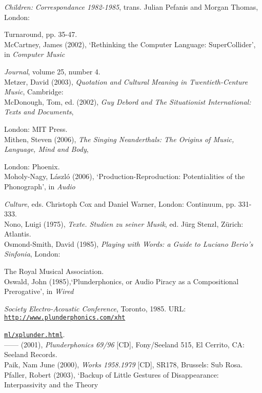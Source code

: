 \emph{Children:} \emph{Correspondance 1982-1985}, trans. Julian Pefanis and Morgan Thomas, London: 

Turnaround, pp. 35-47. 
\hypertarget{mccartney}{}\\
McCartney, James (2002), `Rethinking the Computer Language: SuperCollider', in \emph{Computer Music} 

\emph{Journal}, volume 25, number 4.
\hypertarget{metzer}{}\\
Metzer, David (2003), \emph{Quotation and Cultural Meaning in Twentieth-Centure Music}, Cambridge: 
\hypertarget{mcdonough}{}\\
McDonough, Tom, ed. (2002), \emph{Guy Debord and The Situationist International: Texts and Documents}, 

London: MIT Press. 
\hypertarget{mithen}{}\\
Mithen, Steven (2006), \emph{The Singing Neanderthals: The Origins of Music, Language, Mind and Body}, 

London: Phoenix. 
\hypertarget{moholy}{}\\
Moholy-Nagy, L\'{a}szl\'{o} (2006),  `Production-Reproduction: Potentialities of the Phonograph', in \emph{Audio} 

\emph{Culture}, eds. Christoph Cox and Daniel Warner, London: Continuum, pp. 331-333.
\hypertarget{nono}{}\\
Nono, Luigi (1975), \emph{Texte. Studien zu seiner Musik}, ed. J\"{u}rg Stenzl, Z\"{u}rich: Atlantis. 
\hypertarget{ossmith}{}\\
Osmond-Smith, David (1985), \emph{Playing with Words: a Guide to Luciano Berio's Sinfonia},  London: 

The Royal Musical Association. 
\hypertarget{oswald}{}\\
Oswald, John (1985),`Plunderphonics, or Audio Piracy as a Compositional Prerogative', in \emph{Wired}

\emph{Society Electro-Acoustic Conference}, Toronto, 1985. URL: \href{http://www.plunderphonics.com/xhtml/xplunder.html}{\texttt{http://www.plunderphonics.com/xht}}

\href{http://www.plunderphonics.com/xhtml/xplunder.html}{\texttt{ml/xplunder.html}}.
\hypertarget{oswaldcd}{}\\
------ (2001), \emph{Plunderphonics 69/96} [CD], Fony/Seeland 515, El Cerrito, CA: Seeland Records.  
\hypertarget{paik}{}\\
Paik, Nam June (2000), \emph{Works 1958.1979} [CD], SR178, Brussels: Sub Rosa. 
\hypertarget{pfaller}{}\\
Pfaller, Robert (2003), `Backup of Little Gestures of Disappearance: Interpassivity and the Theory 

